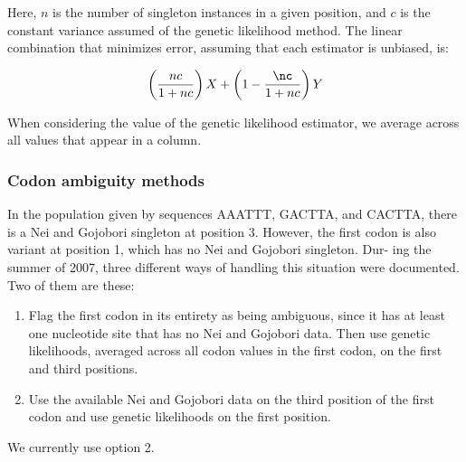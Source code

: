 \documentclass{article}
\begin{document}
	Here, $n$ is the number of singleton instances in a given position, and
	$c$ is the constant variance assumed of the genetic likelihood method.
	The linear combination that minimizes error, assuming that each
	estimator is unbiased, is:

	$$ \left( {nc \over 1 + nc} \right) X + \left (1 - {\nc \over 1 +
	    nc}\right) Y $$

	When considering the value of the genetic likelihood estimator, we
	average across all values that appear in a column.

      \subsubsection{Codon ambiguity methods}
	\label{sec:codon-ambiguity}

	In the population given by sequences AAATTT, GACTTA, and CACTTA,
	there is a Nei and Gojobori singleton at position 3. However, the first codon
	is also variant at position 1, which has no Nei and Gojobori singleton. Dur-
	ing the summer of 2007, three different ways of handling this situation were
	documented. Two of them are these:

	\begin{enumerate}
	  \item Flag the first codon in its entirety as being ambiguous, since
	  it has at least one nucleotide site that has no Nei and Gojobori data.
	  Then use genetic likelihoods, averaged across all codon values in the
	  first codon, on the first and third positions.

	  \item Use the available Nei and Gojobori data on the third position of
	  the first codon and use genetic likelihoods on the first position.
	\end{enumerate}

	We currently use option 2.
\end{document}
